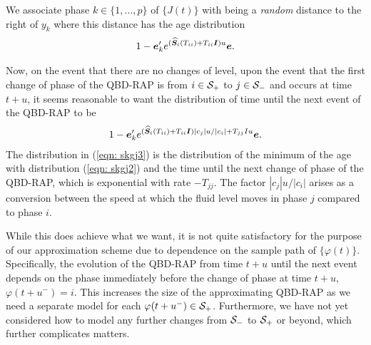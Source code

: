 We associate phase \(k\in\{1,...,p\}\) of \(\{J(t)\}\) with being a \emph{random} distance to the right of \(y_k\) where this distance has the age distribution 
\begin{align}
	1-\boldsymbol e_k' e^{(\widehat{\boldsymbol S}_i(T_{ii}) + T_{ii}\boldsymbol I)u} \boldsymbol e.\label{eqn: skgj2}
\end{align}


Now, on the event that there are no changes of level, upon the event that the first change of phase of the QBD-RAP is from \(i\in\mathcal{S}_+\) to \(j\in\mathcal{S}_-\) and occurs at time \(t+u\), it seems reasonable to want the distribution of time until the next event of the QBD-RAP to be
\begin{align}
	1-\boldsymbol e_k' e^{(\widehat{\boldsymbol S}_i(T_{ii}) + T_{ii}\boldsymbol I)|c_j|u/|c_i| + T_{jj}Iu} \boldsymbol e.\label{eqn: skgj3}
\end{align}
The distribution in (\ref{eqn: skgj3}) is the distribution of the minimum of the age with distribution (\ref{eqn: skgj2}) and the time until the next change of phase of the QBD-RAP, which is exponential with rate \(-T_{jj}\). The factor \(|c_j|u/|c_i|\) arises as a conversion between the speed at which the fluid level moves in phase \(j\) compared to phase \(i\). 

While this does achieve what we want, it is not quite satisfactory for the purpose of our approximation scheme due to dependence on the sample path of \(\{\varphi(t)\}\). Specifically, the evolution of the QBD-RAP from time \(t+u\) until the next event depends on the phase immediately before the change of phase at time \(t+u\), \(\varphi(t+u^-)=i\). This increases the size of the approximating QBD-RAP as we need a separate model for each \(\varphi(t+u^-)\in\mathcal{S}_+\). Furthermore, we have not yet considered how to model any further changes from \(\mathcal{S}_-\) to \(\mathcal{S}_+\) or beyond, which further complicates matters. 

